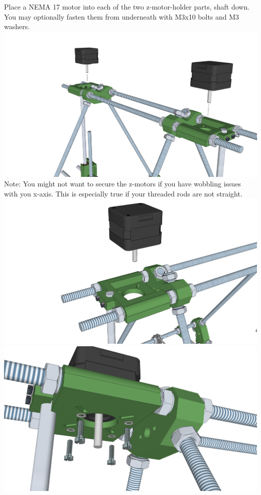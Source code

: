 \documentclass[twoside,a4paper,titlepage]{memoir}
\begin{document}
	\section{}
	Place a NEMA 17 motor into each of the two z-motor-holder parts, shaft down. You
	may optionally fasten them from underneath with M3x10 bolts and M3 washers.\\
	\includegraphics[width=1\linewidth]{graphics/ch8_19_1.png}	
	Note: You might not want to secure the z-motors if you have wobbling issues with you x-axis. This is
	especially true if your threaded rods are not straight.\\
	\includegraphics[width=1\linewidth]{graphics/ch8_19_2.png}
	\includegraphics[width=1\linewidth]{graphics/ch8_19_3.png}
\end{document}
